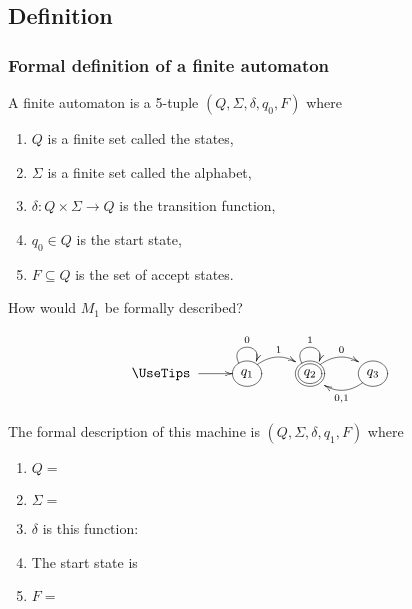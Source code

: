 \documentclass[xcolor=table]{beamer}
\begin{document}
\subsection[definition]{Definition}

\begin{frame}
  \frametitle{Formal definition of a finite automaton}

  \begin{Definition}
    A \alert{finite
      automaton} is a 5-tuple $(Q,\Sigma, \delta, q_0, F)$ where
      \begin{enumerate}
	\item $Q$ is a finite set called the \alert{states},
	\item $\Sigma$ is a finite set called the \alert{alphabet},
	\item $\delta: Q\times \Sigma \rightarrow Q$ is the
	\alert{transition function},
	\item $q_0 \in Q$ is the \alert{start state},
	\item $F \subseteq Q$ is the \alert{set of accept states}.
      \end{enumerate}
  \end{Definition}

  \bigskip
  How would $M_1$ be formally described?

\end{frame}

\begin{frame}

  \[\UseTips
  \xymatrix {
      *+\txt{\ } \ar[r] & *++[o][F]{q_1} \ar@(ul,ur)^{0}
  \ar@/^1pc/[r]^{1} & *++[o][F=]{q_2} \ar@(ul,ur)^{1}
  \ar@/^1pc/[r]^{0} & *++[o][F]{q_3} \ar@/^1pc/[l]^{0,1}
  }
  \]

  The formal description of this machine is $(Q,\Sigma,\delta,q_1,F)$
  where
  \begin{enumerate}
    \item $Q = $ 
    \item $\Sigma = $ 
    \item $\delta$ is this function:

    \item The start state is 
    \item $F = $ 
  \end{enumerate}

\end{frame}
\end{document}
